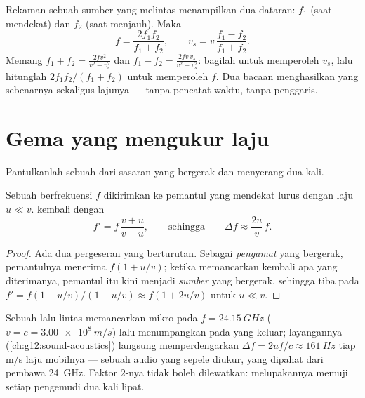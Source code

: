 \begin{method}\label{met:g12:doppler-effect:pass}
Rekaman sebuah sumber yang melintas menampilkan dua dataran: $f_1$ (saat mendekat) dan
$f_2$ (saat menjauh). Maka
\[
f = \frac{2 f_1 f_2}{f_1 + f_2}, \qquad
v_s = v\,\frac{f_1 - f_2}{f_1 + f_2}.
\]
Memang $f_1 + f_2 = \frac{2fv^2}{v^2 - v_s^2}$ dan
$f_1 - f_2 = \frac{2fv\,v_s}{v^2 - v_s^2}$: bagilah untuk memperoleh $v_s$, lalu hitunglah
$2f_1 f_2/(f_1 + f_2)$ untuk memperoleh $f$. Dua bacaan  menghasilkan 
yang sebenarnya sekaligus lajunya --- tanpa pencatat waktu, tanpa penggaris.
\end{method}

\section{Gema yang mengukur laju}

Pantulkanlah sebuah  dari sasaran yang bergerak dan  menyerang dua kali.

\begin{proposition}\label{prop:g12:doppler-effect:double}
Sebuah  berfrekuensi $f$ dikirimkan ke pemantul yang mendekat lurus dengan laju
$u \ll v$.  kembali dengan
\[ f' = f\,\frac{v + u}{v - u}, \qquad \text{sehingga} \qquad \Delta f \approx \frac{2u}{v}\,f . \]
\end{proposition}

\begin{proof}
Ada dua pergeseran yang berturutan. Sebagai \emph{pengamat} yang bergerak, pemantulnya
menerima $f(1 + u/v)$; ketika memancarkan kembali apa yang diterimanya, pemantul itu kini
menjadi \emph{sumber} yang bergerak, sehingga  tiba pada
$f' = f(1 + u/v)/(1 - u/v) \approx f(1 + 2u/v)$ untuk $u \ll v$.
\end{proof}

\begin{example}\label{ex:g12:doppler-effect:radar}
Sebuah  lalu lintas memancarkan  mikro pada $f = \qty{24.15}{GHz}$
($v = c = \qty{3.00e8}{m/s}$) lalu menumpangkan  pada  yang keluar;
layangannya (\cref{ch:g12:sound-acoustics}) langsung memperdengarkan
$\Delta f = 2uf/c \approx \qty{161}{Hz}$ tiap \unit{m/s} laju mobilnya --- sebuah 
audio yang sepele diukur, yang dipahat dari pembawa \qty{24}{GHz}. Faktor $2$-nya tidak
boleh dilewatkan: melupakannya memuji setiap pengemudi dua kali lipat.
\end{example}

